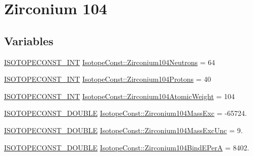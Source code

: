 \hypertarget{group___isotope_const-_zirconium-_zr104}{}\section{Zirconium 104}
\label{group___isotope_const-_zirconium-_zr104}
\subsection*{Variables}
\begin{DoxyCompactItemize}
\item 
\mbox{\hyperlink{group___isotope_const-_macros_ga5f18360b3e99483a35c32d789e62621c}{I\+S\+O\+T\+O\+P\+E\+C\+O\+N\+S\+T\+\_\+\+I\+NT}} \mbox{\hyperlink{group___isotope_const-_zirconium-_zr104_gac2281a6f0b27b172e77dc990d58aff46}{Isotope\+Const\+::\+Zirconium104\+Neutrons}} = 64
\item 
\mbox{\hyperlink{group___isotope_const-_macros_ga5f18360b3e99483a35c32d789e62621c}{I\+S\+O\+T\+O\+P\+E\+C\+O\+N\+S\+T\+\_\+\+I\+NT}} \mbox{\hyperlink{group___isotope_const-_zirconium-_zr104_ga01e8c6eef3b780da9f6edc38a7ef1736}{Isotope\+Const\+::\+Zirconium104\+Protons}} = 40
\item 
\mbox{\hyperlink{group___isotope_const-_macros_ga5f18360b3e99483a35c32d789e62621c}{I\+S\+O\+T\+O\+P\+E\+C\+O\+N\+S\+T\+\_\+\+I\+NT}} \mbox{\hyperlink{group___isotope_const-_zirconium-_zr104_gaa442cff5913443b8af681d1e2edb2a15}{Isotope\+Const\+::\+Zirconium104\+Atomic\+Weight}} = 104
\item 
\mbox{\hyperlink{group___isotope_const-_macros_ga8f45a7272ce02c0b4c65c44636ed719a}{I\+S\+O\+T\+O\+P\+E\+C\+O\+N\+S\+T\+\_\+\+D\+O\+U\+B\+LE}} \mbox{\hyperlink{group___isotope_const-_zirconium-_zr104_gabb92a5d2112276db6a3db04f9687df19}{Isotope\+Const\+::\+Zirconium104\+Mass\+Exc}} = -\/65724.
\item 
\mbox{\hyperlink{group___isotope_const-_macros_ga8f45a7272ce02c0b4c65c44636ed719a}{I\+S\+O\+T\+O\+P\+E\+C\+O\+N\+S\+T\+\_\+\+D\+O\+U\+B\+LE}} \mbox{\hyperlink{group___isotope_const-_zirconium-_zr104_ga76b4bd2e6d50de9360b60f4271cba1a4}{Isotope\+Const\+::\+Zirconium104\+Mass\+Exc\+Unc}} = 9.
\item 
\mbox{\hyperlink{group___isotope_const-_macros_ga8f45a7272ce02c0b4c65c44636ed719a}{I\+S\+O\+T\+O\+P\+E\+C\+O\+N\+S\+T\+\_\+\+D\+O\+U\+B\+LE}} \mbox{\hyperlink{group___isotope_const-_zirconium-_zr104_gae0bc22595e1a77b2a3aeb351fced4ccf}{Isotope\+Const\+::\+Zirconium104\+Bind\+E\+PerA}} = 8402.
\item 

\end{DoxyCompactItemize}
